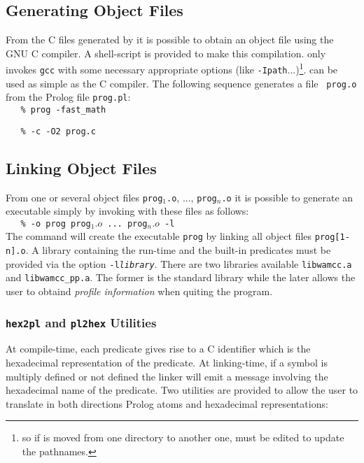 \subsection{Generating Object Files}

From the C files generated by {\wamcc} it is possible to obtain an
object file using the GNU C compiler. A shell-script {\wgcc} is provided to
make this compilation. {\wgcc} only invokes {\tt gcc} with some necessary
appropriate options (like {\tt -Ipath}...)\footnote{so if
{\wamcc} is moved from one directory to another one, {\wgcc} must be
edited to update the pathnames.}. {\wgcc} can be used as
simple as the C compiler. The following sequence generates a file {\tt
prog.o} from the Prolog file {\tt prog.pl}:\\

{\tt ~~~\%{\wamcc} prog -fast\_math}

{\tt ~~~\%{\wgcc} -c -O2 prog.c}



\subsection{Linking Object Files}

From one or several object files {\tt prog$_1$.o}, ..., {\tt prog$_n$.o}
it is possible to generate an executable simply by invoking {\wgcc}
with these files as follows:\\

{\tt ~~~\%{\wgcc} -o prog prog$_1.o$ ... prog$_n.o$ -l{\wamcc}}\\

The command will create the executable {\tt prog} by linking all
object files {\tt prog[1-n].o}. A library containing the run-time and
the built-in predicates must be provided via the option 
{\tt -l{\em library}}. There are two libraries available
{\tt libwamcc.a} and {\tt libwamcc\_pp.a}. The former is the standard
library while the later allows the user to obtaind {\em profile
information} when quiting the program.\\



\subsubsection{{\tt hex2pl} and {\tt pl2hex} Utilities}

At compile-time, each predicate gives rise to a C identifier which is
the hexadecimal representation of the predicate. At linking-time, if a
symbol is multiply defined or not defined the linker will emit a
message involving the hexadecimal name of the predicate. Two utilities
are provided to allow the user to translate in both directions Prolog
atoms and hexadecimal representations:\\


